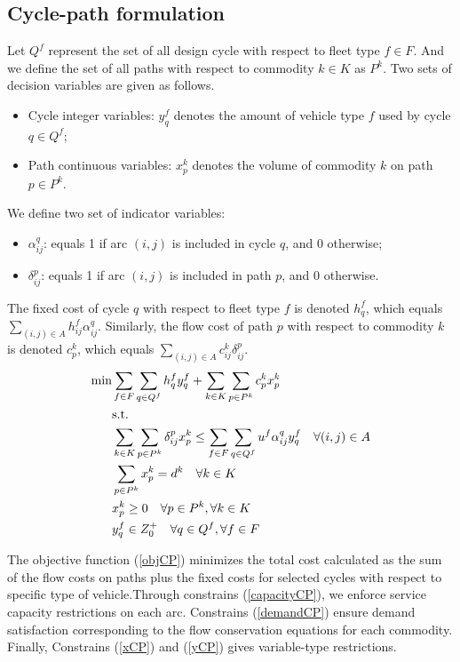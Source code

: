 \documentclass[11pt,nonblindrev,fleqn]{article}
\begin{document}
\subsection{Cycle-path formulation}
Let $Q^f$ represent the set of all design cycle with respect to fleet type $f\in F$. And we define the set of all paths with respect to commodity $k\in K$ as $P^k$. Two sets of decision variables are given as follows.
\begin{itemize}
  \item Cycle integer variables: $y_q^f$ denotes the amount of vehicle type $f$ used by cycle $q\in Q^f$;
  \item Path continuous variables: $x_p^k$ denotes the volume of commodity $k$ on path $p\in P^k$.
\end{itemize}
We define two set of indicator variables:
\begin{itemize}
  \item $\alpha_{ij}^q$: equals 1 if arc $(i,j)$ is included in cycle $q$, and 0 otherwise;
  \item $\delta_{ij}^p$: equals 1 if arc $(i,j)$ is included in path $p$, and 0 otherwise.
\end{itemize}

The fixed cost of cycle $q$ with respect to fleet type $f$ is denoted $h_q^f$, which equals $\sum_{(i,j)\in A} h_{ij}^f \alpha_{ij}^q$. Similarly, the flow cost of path $p$ with respect to commodity $k$ is denoted $c_p^k$, which equals $\sum_{(i,j)\in A} c_{ij}^k \delta_{ij}^p$.
\begin{align}
  \min &    \sum_{f\in F}\sum_{q\in Q^f}h_q^f y_q^f  +   \sum_{k\in K}\sum_{p\in P^k}c_p^k x_p^k  \label{objCP}    \\
         & \rm{s.t.} \nonumber \\
         &     \sum_{k\in K}\sum_{p\in P^k}\delta_{ij}^p x_p^k \leq  \sum_{f\in F}\sum_{q\in Q^f}u^f \alpha_{ij}^q y_q^f      \quad \forall (i,j)\in A \label{capacityCP}\\
         &     \sum_{p\in P^k}x_p^k = d^k      \quad       \forall k\in K  \label{demandCP}    \\
         &      x_p^k \geq 0        \quad       \forall p\in P^k,\forall k\in K     \label{xCP} \\
         &      y_q^f \in Z_0^+     \quad       \forall q\in Q^f, \forall f\in F    \label{yCP}
\end{align}

The objective function (\ref{objCP}) minimizes the total cost calculated as the sum of the flow costs on paths plus the fixed costs for selected cycles with respect to specific type of vehicle.Through constrains (\ref{capacityCP}), we enforce service capacity restrictions on each arc. Constrains (\ref{demandCP}) ensure demand satisfaction corresponding to the flow conservation equations for each commodity. Finally, Constrains (\ref{xCP}) and (\ref{yCP}) gives variable-type restrictions.
\end{document}
